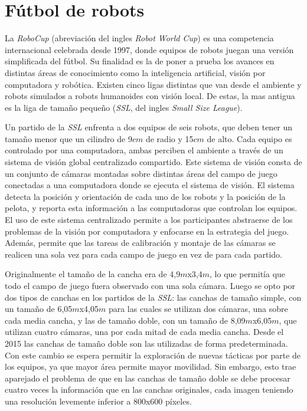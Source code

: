 
\section{Fútbol de robots}

La \emph{RoboCup} (abreviación del ingles \emph{Robot World Cup}) es una
competencia internacional celebrada desde 1997, donde equipos de robots juegan
una versión simplificada del fútbol. Su finalidad es la de poner a prueba los
avances en distintas áreas de conocimiento como la inteligencia artificial,
visión por computadora y robótica. Existen cinco ligas distintas que van desde
el ambiente y robots simulados a robots humanoides con visión local. De estas,
la mas antigua es la liga de tamaño pequeño (\emph{SSL}, del ingles \emph{Small
Size League}).

Un partido de la \emph{SSL} enfrenta a dos equipos de seis robots, que deben
tener un tamaño menor que un cilindro de 9$cm$ de radio y 15$cm$ de
alto\cite{sslrules2015}. Cada equipo es controlado por una computadora, ambas
perciben el ambiente a través de un sistema de visión global centralizado
compartido. Este sistema de visión consta de un conjunto de cámaras montadas
sobre distintas áreas del campo de juego conectadas a una computadora donde se
ejecuta el sistema de visión. El sistema detecta la posición y orientación de
cada uno de los robots y la posición de la pelota, y reporta esta información a
las computadoras que controlan los equipos. El uso de este sistema centralizado
permite a los participantes abstraerse de los problemas de la visión por
computadora y enfocarse en la estrategia del juego. Además, permite que las
tareas de calibración y montaje de las cámaras se realicen una sola vez para
cada campo de juego en vez de para cada partido.


Originalmente el tamaño de la cancha era de 4,9$m$x3,4$m$, lo que permitía que
todo el campo de juego fuera observado con una sola cámara. Luego se opto por
dos tipos de canchas en los partidos de la \emph{SSL}: las canchas de tamaño
simple, con un tamaño de 6,05$m$x4,05$m$ para las cuales se utilizan dos
cámaras, una sobre cada media cancha, y las de tamaño doble, con un tamaño de
8,09$m$x6,05$m$, que utilizan cuatro cámaras, una por cada mitad de cada media
cancha. Desde el 2015 las canchas de tamaño doble son las utilizadas de forma
predeterminada\cite{sslrules2015}. Con este cambio se espera permitir la
exploración de nuevas tácticas por parte de los equipos, ya que mayor área
permite mayor movilidad. Sin embargo, esto trae aparejado el problema de que en
las canchas de tamaño doble se debe procesar cuatro veces la información que en
las canchas originales, cada imagen teniendo una resolución levemente inferior a
800x600 píxeles.
